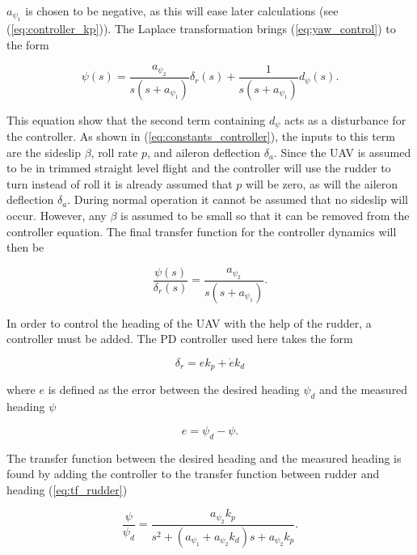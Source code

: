 $a_{\psi_1}$ is chosen to be negative, as this will ease later calculations (see (\ref{eq:controller_kp})). The Laplace transformation brings (\ref{eq:yaw_control}) to the form

\begin{equation}
	\label{eq:yaw_controller_s}
	\psi(s) = \frac{a_{\psi_2}}{s(s+a_{\psi_1})}\delta_r(s) + \frac{1}{s(s+a_{\psi_1})}d_\psi(s).
\end{equation}

This equation show that the second term containing $d_\psi$ acts as a disturbance for the controller. As shown in (\ref{eq:constants_controller}), the inputs to this term are the sideslip $\beta$, roll rate $p$, and aileron deflection $\delta_a$. Since the UAV is assumed to be in trimmed straight level flight and the controller will use the rudder to turn instead of roll it is already assumed that $p$ will be zero, as will the aileron deflection $\delta_a$. During normal operation it cannot be assumed that no sideslip will occur. However, any $\beta$ is assumed to be small so that it can be removed from the controller equation. The final transfer function for the controller dynamics will then be

\begin{equation}
	\label{eq:tf_rudder}
	\frac{\psi(s)}{\delta_r(s)} = \frac{a_{\psi_2}}{s(s+a_{\psi_1})}.
\end{equation}

In order to control the heading of the UAV with the help of the rudder, a controller must be added. The PD controller used here takes the form

\begin{equation}
	\delta_r = ek_p + \dot{e}k_d
\end{equation}

where $e$ is defined as the error between the desired heading $\psi_d$ and the measured heading $\psi$

\begin{equation}
	e = \psi_d - \psi.
\end{equation}

The transfer function between the desired heading and the measured heading is found by adding the controller to the transfer function between rudder and heading (\ref{eq:tf_rudder})

\begin{equation}
	\label{eq:rudder_PD}
	\frac{\psi}{\psi_d} = \frac{a_{\psi_2}k_p}{s^2 + (a_{\psi_1}+a_{\psi_2}k_d)s + a_{\psi_2}k_p}.
\end{equation}

